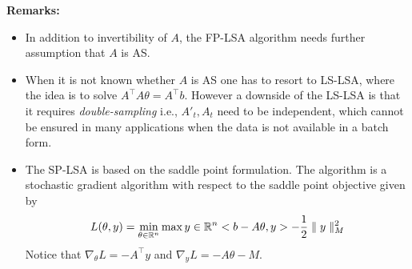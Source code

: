 \textbf{Remarks:}
\begin{itemize}[leftmargin=*]
\item In addition to invertibility of $A$, the FP-LSA algorithm needs further assumption that $A$ is AS.
\item When it is not known whether $A$ is AS one has to resort to LS-LSA, where the idea is to solve $A^{\top} A\theta=A^{\top} b$. However a downside of the LS-LSA is that it requires \emph{double-sampling} i.e., $A'_t,A_t$ need to be independent, which cannot be ensured in many applications when the data is not available in a batch form.
\item The SP-LSA is based on the saddle point formulation. The algorithm is a stochastic gradient algorithm with respect to the saddle point objective given by
\begin{align}
L(\theta,y)=\min_{\theta\in \mathbb{R}^n}\max{y\in \mathbb{R}^n}<b-A\theta,y>-\frac{1}{2}\parallel y\parallel_M ^2
\end{align}
Notice that $\nabla_\theta L =-A^\top y$ and $\nabla_{y}L=-A\theta-M$.
\end{itemize}



